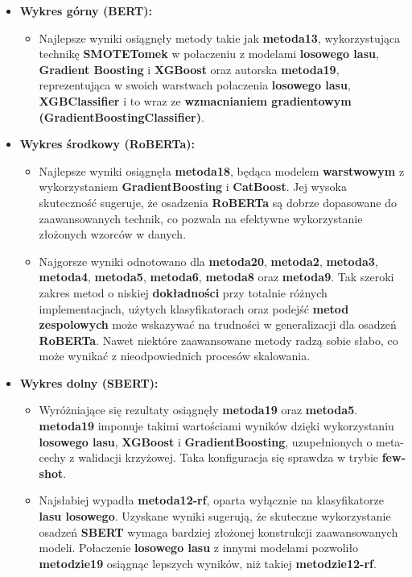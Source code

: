 \begin{itemize}
	\item \textbf{Wykres górny (BERT):}
	      \begin{itemize}
		      \item Najlepsze wyniki osiągnęły metody takie jak \textbf{metoda13}, wykorzystująca technikę \textbf{SMOTETomek} w połaczeniu z modelami \textbf{losowego lasu}, \textbf{Gradient Boosting} i \textbf{XGBoost} oraz autorska \textbf{metoda19}, reprezentująca w swoich warstwach połaczenia \textbf{losowego lasu}, \textbf{XGBClassifier} i to wraz ze \textbf{wzmacnianiem gradientowym (GradientBoostingClassifier)}.
	      \end{itemize}

	\item \textbf{Wykres środkowy (RoBERTa):}
	      \begin{itemize}
		      \item Najlepsze wyniki osiągnęła \textbf{metoda18}, będąca modelem \textbf{warstwowym} z wykorzystaniem \textbf{GradientBoosting} i \textbf{CatBoost}. Jej wysoka skuteczność sugeruje, że osadzenia \textbf{RoBERTa} są dobrze dopasowane do zaawansowanych technik, co pozwala na efektywne wykorzystanie złożonych wzorców w danych.
		      \item Najgorsze wyniki odnotowano dla \textbf{metoda20}, \textbf{metoda2}, \textbf{metoda3}, \textbf{metoda4}, \textbf{metoda5}, \textbf{metoda6}, \textbf{metoda8} oraz \textbf{metoda9}. Tak szeroki zakres metod o niskiej \textbf{dokładności} przy totalnie różnych implementacjach, użytych klasyfikatorach oraz podejść \textbf{metod zespolowych} może wskazywać na trudności w generalizacji dla osadzeń \textbf{RoBERTa}. Nawet niektóre zaawansowane metody radzą sobie słabo, co może wynikać z nieodpowiednich procesów skalowania.
	      \end{itemize}

	\item \textbf{Wykres dolny (SBERT):}
	      \begin{itemize}
		      \item Wyróżniające się rezultaty osiągnęły \textbf{metoda19} oraz \textbf{metoda5}. \textbf{metoda19} imponuje takimi wartościami wyników dzięki wykorzystaniu \textbf{losowego lasu}, \textbf{XGBoost} i \textbf{GradientBoosting}, uzupełnionych o meta-cechy z walidacji krzyżowej. Taka konfiguracja się sprawdza w trybie \textbf{few-shot}.
		      \item Najsłabiej wypadła \textbf{metoda12-rf}, oparta wyłącznie na klasyfikatorze \textbf{lasu losowego}. Uzyskane wyniki sugerują, że skuteczne wykorzystanie osadzeń \textbf{SBERT} wymaga bardziej złożonej konstrukcji zaawansowanych modeli. Połaczenie \textbf{losowego lasu} z innymi modelami pozwoliło \textbf{metodzie19} osiągnąc lepszych wyników, niż takiej \textbf{metodzie12-rf}.
	      \end{itemize}
\end{itemize}

